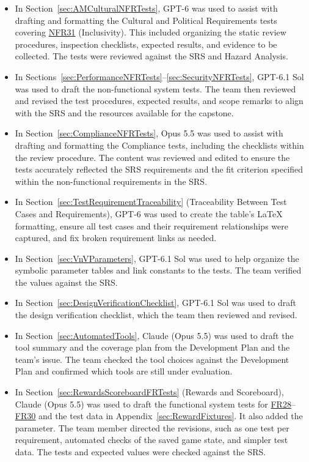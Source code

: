 \documentclass[10pt,titlepage]{article}
\newcommand{\srsurl}{https://team-hindsight.github.io/ophthamology-game/SRS/SRS.pdf}
\newcommand{\srsfrref}[2]{\href{\srsurl\#nameddest=#1}{FR#2}}
\newcommand{\srsnfrref}[2]{\href{\srsurl\#nameddest=#1}{NFR#2}}
\newcommand{\constref}[1]{\hyperlink{const:#1}{\texttt{\detokenize{#1}}}}
\begin{document}
\begin{itemize}
  \item In Section~\ref{sec:AMCulturalNFRTests}, GPT-6 was used to assist
  with drafting and formatting the Cultural and Political
  Requirements tests covering \srsnfrref{NFR_Inclusivity}{31} (Inclusivity). This included
  organizing the static review procedures, inspection checklists,
  expected results, and evidence to be collected. The tests were
  reviewed against the SRS and Hazard Analysis.

  \item In Sections~\ref{sec:PerformanceNFRTests}--\ref{sec:SecurityNFRTests},
  GPT-6.1 Sol was used to draft the non-functional system tests. The team then
  reviewed and revised the test procedures, expected results, and scope remarks
  to align with the SRS and the resources available for the capstone.

  \item In Section~\ref{sec:ComplianceNFRTests}, Opus 5.5 was used to assist with drafting and
  formatting the Compliance tests, including the checklists within the review procedure. The content was 
  reviewed and edited to ensure the tests accurately reflected the SRS requirements and the fit criterion 
  specified within the non-functional requirements in the SRS.

  \item In Section~\ref{sec:TestRequirementTraceability} (Traceability Between
  Test Cases and Requirements), GPT-6 was used to create the table's
  \LaTeX{} formatting, ensure all test cases and their requirement relationships
  were captured, and fix broken requirement links as needed.

  \item In Section~\ref{sec:VnVParameters}, GPT-6.1 Sol was used to help
  organize the symbolic parameter tables and link constants to the tests.
  The team verified the values against the SRS.

  \item In Section~\ref{sec:DesignVerificationChecklist}, GPT-6.1 Sol was used
  to draft the design verification checklist, which the team then reviewed
  and revised.

  \item In Section~\ref{sec:AutomatedTools}, Claude (Opus 5.5) was used to draft
  the tool summary and the coverage plan from the Development Plan and the
  team's issue. The team checked the tool choices against the Development Plan
  and confirmed which tools are still under evaluation.

  \item In Section~\ref{sec:RewardsScoreboardFRTests} (Rewards and Scoreboard),
  Claude (Opus 5.5) was used to draft the functional system tests for
  \srsfrref{FR_FirstReward}{28}--\srsfrref{FR_Scoreboard}{30} and the test data in Appendix~\ref{sec:RewardFixtures}. It also
  added the \constref{REPLAY_TRIALS_MIN} parameter. The team member directed
  the revisions, such as one test per requirement, automated checks of the
  saved game state, and simpler test data. The tests and expected values were
  checked against the SRS.


\end{itemize}
\end{document}

